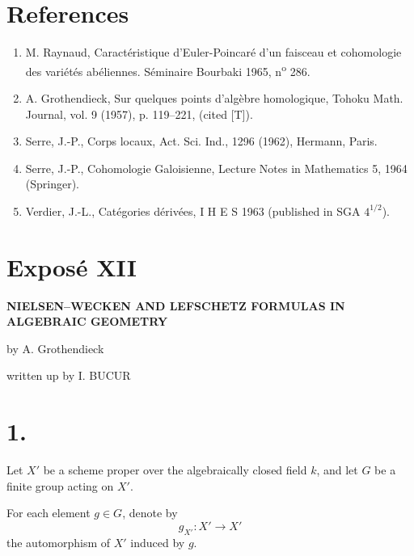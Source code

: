\section*{References}

\begin{enumerate}
\item[{[1]}] M. Raynaud, Caractéristique d'Euler-Poincaré d'un faisceau et cohomologie des variétés abéliennes. Séminaire Bourbaki 1965, n\textsuperscript{o} 286.
\item[{[2]}] A. Grothendieck, Sur quelques points d'algèbre homologique, Tohoku Math. Journal, vol. 9 (1957), p. 119--221, (cited [T]).
\item[{[3]}] Serre, J.-P., Corps locaux, Act. Sci. Ind., 1296 (1962), Hermann, Paris.
\item[{[4]}] Serre, J.-P., Cohomologie Galoisienne, Lecture Notes in Mathematics 5, 1964 (Springer).
\item[{[5]}] Verdier, J.-L., Catégories dérivées, I H E S 1963 (published in SGA $4^{1/2}$).
\end{enumerate}


\section*{Exposé XII}

\begin{center}
\Large\bfseries NIELSEN--WECKEN AND LEFSCHETZ FORMULAS IN ALGEBRAIC GEOMETRY
\end{center}

\begin{center}
by A. Grothendieck

written up by I. BUCUR
\end{center}

\bigskip

\section*{1.}
Let $X'$ be a scheme proper over the algebraically closed field $k$, and let $G$ be a finite group acting on $X'$.

For each element $g\in G$, denote by
\[
g_{X'}:X'\to X'
\]
the automorphism of $X'$ induced by $g$.

